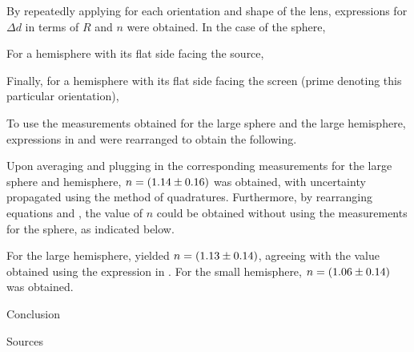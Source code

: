 \begin{paper}
	By repeatedly applying \eqVertexToSecondaryPrincipalPlane for each orientation and shape of the lens, expressions for \( \Delta d \) in terms of \( R \) and \( n \) were obtained. In the case of the sphere,
	
	For a hemisphere with its flat side facing the source, 
	
	Finally, for a hemisphere with its flat side facing the screen (prime denoting this particular orientation),
	
	To use the measurements obtained for the large sphere and the large hemisphere, expressions in \eqSphereData and \eqHemisphereFlatScreen were rearranged to obtain the following.
	
	Upon averaging and plugging in the corresponding measurements for the large sphere and hemisphere, \( n = \left(1.14 \pm 0.16\right) \) was obtained, with uncertainty propagated using the method of quadratures. Furthermore, by rearranging equations \eqHemisphereFlatSource and \eqHemisphereFlatScreen, the value of \( n \) could be obtained without using the measurements for the sphere, as indicated below.
	
	For the large hemisphere, \eqnHemisphereOnly yielded \( n = \left(1.13 \pm 0.14\right) \), agreeing with the value obtained using the expression in \eqnValueWithSphere. For the small hemisphere, \( n = \left(1.06 \pm 0.14\right) \) was obtained. 
	

		Conclusion 


	Sources

\end{paper}


